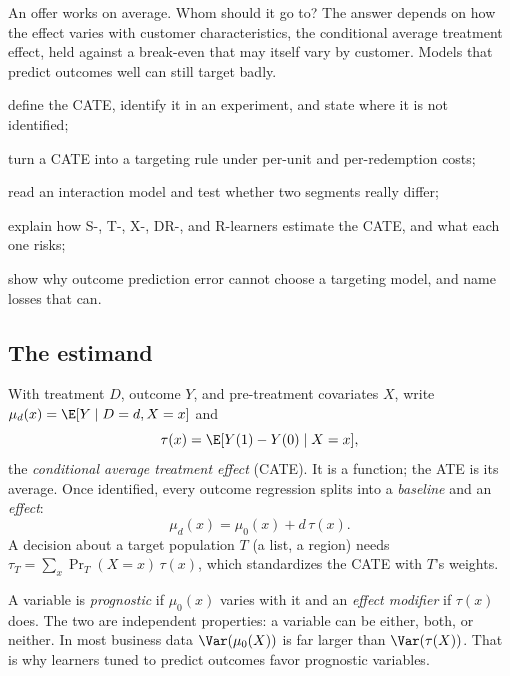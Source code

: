 \documentclass[11pt]{article}
\begin{document}

\begin{decision}
An offer works on average. Whom should it go to? The answer depends on how the effect varies with customer
characteristics, the conditional average treatment effect, held against a break-even that may itself vary
by customer. Models that predict outcomes well can still target badly.
\end{decision}

\begin{goals}
  \item define the CATE, identify it in an experiment, and state where it is not identified;
  \item turn a CATE into a targeting rule under per-unit and per-redemption costs;
  \item read an interaction model and test whether two segments really differ;
  \item explain how S-, T-, X-, DR-, and R-learners estimate the CATE, and what each one risks;
  \item show why outcome prediction error cannot choose a targeting model, and name losses that can.
\end{goals}

\sectionone

\subsection{The estimand}

With treatment $D$, outcome $Y$, and pre-treatment covariates $X$, write $\mu_d(x) = \E[Y \mid D=d, X=x]$ and
\[
  \tau(x) = \E[Y(1) - Y(0) \mid X = x],
\]
the \emph{conditional average treatment effect} (CATE). It is a function; the ATE is its average. Once
identified, every outcome regression splits into a \emph{baseline} and an \emph{effect}:
\begin{equation}\label{eq:decomp}
  \mu_d(x) = \mu_0(x) + d\,\tau(x).
\end{equation}
A decision about a target population $T$ (a list, a region) needs $\tau_T = \sum_x \Pr_T(X=x)\,\tau(x)$, which
standardizes the CATE with $T$'s weights.

A variable is \emph{prognostic} if $\mu_0(x)$ varies with it and an \emph{effect modifier} if $\tau(x)$ does.
The two are independent properties: a variable can be either, both, or neither. In most business data
$\Var(\mu_0(X))$ is far larger than $\Var(\tau(X))$. That is why learners tuned to predict outcomes favor
prognostic variables.
\end{document}
